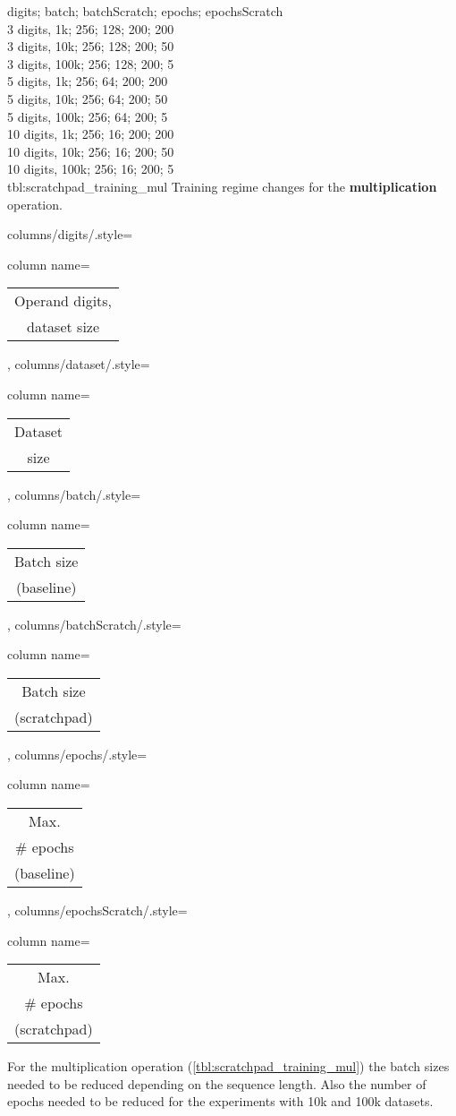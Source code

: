 {
    digits; batch; batchScratch; epochs; epochsScratch\\
    3 digits,  1k;  256; 128; 200; 200\\
    3 digits,  10k;  256; 128; 200; 50\\
    3 digits,  100k;  256; 128; 200; 5\\
    5 digits,  1k;  256; 64; 200; 200\\
    5 digits,  10k;  256; 64; 200; 50\\
    5 digits,  100k;  256; 64; 200; 5\\
    10 digits,  1k;  256; 16; 200; 200\\
    10 digits,  10k;  256; 16; 200; 50\\
    10 digits,  100k;  256; 16; 200; 5\\
}
{tbl:scratchpad_training_mul}
{
    Training regime changes for the \textbf{multiplication} operation.
}
{%
    columns/digits/.style={column name={\begin{tabular}{c}
         Operand digits, \\
         dataset size
    \end{tabular}}},
    columns/dataset/.style={column name={\begin{tabular}{c}
         Dataset \\
         size
    \end{tabular}}},
    columns/batch/.style={column name={\begin{tabular}{c}
         Batch size \\
         (baseline)
    \end{tabular}}},
    columns/batchScratch/.style={column name={\begin{tabular}{c}
         Batch size \\
         (scratchpad)
    \end{tabular}}},
    columns/epochs/.style={column name={\begin{tabular}{c}
         Max. \\
         \# epochs \\
         (baseline)
    \end{tabular}}},
    columns/epochsScratch/.style={column name={\begin{tabular}{c}
         Max. \\
         \# epochs \\
         (scratchpad)
    \end{tabular}}}
}

For the multiplication operation (\cref{tbl:scratchpad_training_mul}) the batch sizes needed to be reduced depending on the sequence length. Also the number of epochs needed to be reduced for the experiments with 10k and 100k datasets.

